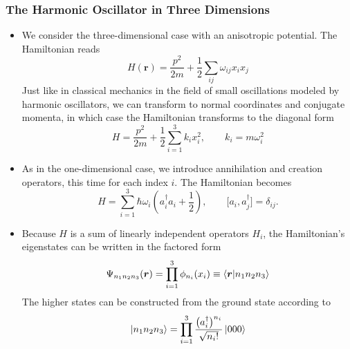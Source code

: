 \documentclass[11pt, a4paper]{article}
\newcommand{\Ham}{Hamiltonian\xspace}
\renewcommand{\vec}[1]{\bm{#1}} %
\renewcommand{\r}{\vec{r}}  %
\renewcommand{\P}{\Psi}  %
\begin{document}
\subsubsection{The Harmonic Oscillator in Three Dimensions}
\begin{itemize}
	\item We consider the three-dimensional case with an anisotropic potential. The \Ham reads
	\begin{equation*}
		H(\r) = \frac{p^{2}}{2m} + \frac{1}{2}\sum_{ij} \omega_{ij}x_{i}x_{j}
	\end{equation*}
	Just like in classical mechanics in the field of small oscillations modeled by harmonic oscillators, we can transform to normal coordinates and conjugate momenta, in which case the \Ham transforms to the diagonal form
	\begin{equation*}
		H = \frac{p^{2}}{2m} + \frac{1}{2}\sum_{i=1}^{3}k_{i}x_{i}^{2}, \qquad k_{i} = m\omega_{i}^{2}
	\end{equation*}
	
	\item As in the one-dimensional case, we introduce annihilation and creation operators, this time for each index $ i $. The Hamiltonian becomes
	\begin{equation*}
		H = \sum_{i = 1}^{3}\hbar \omega_{i}\left(a^{\dagger}_{i}a_{i} + \frac{1}{2}\right), \qquad \big[a_{i}, a_{j}^{\dagger}\big] = \delta_{ij}.
	\end{equation*}
	
	\item Because $ H $ is a sum of linearly independent operators $ H_{i} $, the \Ham's eigenstates can be written in the factored form
	\begin{equation*}
		\P_{n_{1}n_{2}n_{3}}(\r) = \prod_{i = 1}^{3}\phi_{n_{i}}(x_{i}) \equiv \braket{\r}{n_{1}n_{2}n_{3}}
	\end{equation*}
	The higher states can be constructed from the ground state according to
	\begin{equation*}
		\ket{n_{1}n_{2}n_{3}} = \prod_{i = 1}^{3}\frac{\big(a_{i}^{\dagger}\big)^{n_{i}}}{\sqrt{n_{i}!}}\ket{000}
	\end{equation*}
\end{itemize}
\end{document}

